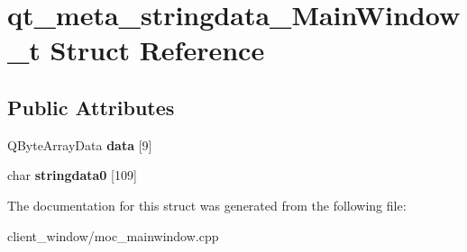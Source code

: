 \hypertarget{structqt__meta__stringdata__MainWindow__t}{}\section{qt\+\_\+meta\+\_\+stringdata\+\_\+\+Main\+Window\+\_\+t Struct Reference}
\label{structqt__meta__stringdata__MainWindow__t}
\subsection*{Public Attributes}
\begin{DoxyCompactItemize}
\item 
Q\+Byte\+Array\+Data {\bfseries data} \mbox{[}9\mbox{]}\hypertarget{structqt__meta__stringdata__MainWindow__t_a0211d0ef37920e3f737c66077647770e}{}\label{structqt__meta__stringdata__MainWindow__t_a0211d0ef37920e3f737c66077647770e}

\item 
char {\bfseries stringdata0} \mbox{[}109\mbox{]}\hypertarget{structqt__meta__stringdata__MainWindow__t_a15ca847206c894d441a960ef800bb33a}{}\label{structqt__meta__stringdata__MainWindow__t_a15ca847206c894d441a960ef800bb33a}

\end{DoxyCompactItemize}


The documentation for this struct was generated from the following file\+:\begin{DoxyCompactItemize}
\item 
client\+\_\+window/moc\+\_\+mainwindow.\+cpp\end{DoxyCompactItemize}
